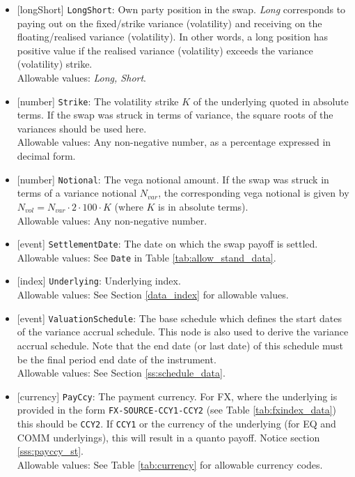 \begin{itemize}
  \item{}[longShort] \lstinline!LongShort!: Own party position in the swap. \emph{Long} corresponds to paying out on the
  fixed/strike variance (volatility) and receiving on the floating/realised variance (volatility). In other words,
  a long position has positive value if the realised variance (volatility) exceeds the variance (volatility)
  strike. \\
  Allowable values: \emph{Long, Short}.
  \item{}[number] \lstinline!Strike!: The volatility strike $K$ of the underlying quoted in absolute terms.
  If the swap was struck in terms of variance, the square roots of the variances should be used here. \\
  Allowable values: Any non-negative number, as a percentage expressed in decimal form.
  \item{}[number] \lstinline!Notional!: The vega notional amount. If the swap was struck in terms of a variance notional
  $N_{var}$, the corresponding vega notional is given by $N_{vol} = N_{var} \cdot 2 \cdot 100 \cdot K$
  (where $K$ is in absolute terms). \\
  Allowable values: Any non-negative number.
  \item{}[event] \lstinline!SettlementDate!: The date on which the swap payoff is settled. \\
  Allowable values: See \lstinline!Date! in Table \ref{tab:allow_stand_data}.
  \item{}[index] \lstinline!Underlying!: Underlying index. \\
  Allowable values: See Section \ref{data_index} for allowable values.
  \item{}[event] \lstinline!ValuationSchedule!: The base schedule which defines the start dates of the variance accrual schedule. This node is
  also used to derive the variance accrual schedule. Note that the end date (or last date) of this schedule must be the final
  period end date of the instrument. \\
  Allowable values: See Section \ref{ss:schedule_data}.
  \item{}[currency] \lstinline!PayCcy!: The payment currency. For FX, where the underlying is provided
      in the form \lstinline!FX-SOURCE-CCY1-CCY2! (see Table \ref{tab:fxindex_data}) this should
      be \lstinline!CCY2!. If \lstinline!CCY1! or the currency of the underlying (for EQ and
      COMM underlyings), this will result in a quanto payoff. Notice section \ref{sss:payccy_st}. \\
        Allowable values: See Table \ref{tab:currency} for allowable currency codes.
\end{itemize}

